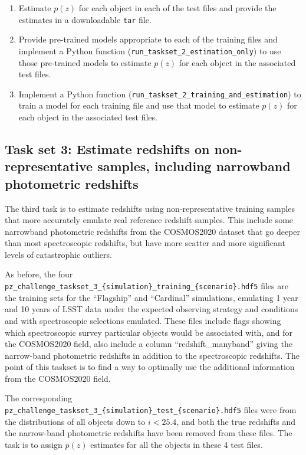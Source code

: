 \documentclass[11pt,twoside,letterpaper,onecolumn,english]{article}
\begin{document}
\begin{enumerate}
  \item{Estimate $p(z)$ for each object in each of the test files and
      provide the estimates in a downloadable \texttt{tar} file.}
  \item{Provide pre-trained models appropriate to each of the training
      files and implement a Python function
      (\texttt{run\_taskset\_2\_estimation\_only}) to use those
      pre-trained models to estimate $p(z)$ for each object in the
      associated test files.}    
  \item{Implement a Python function
      (\texttt{run\_taskset\_2\_training\_and\_estimation}) to train a model for
      each training file and use that model to estimate $p(z)$ for
      each object in the associated test files.}    
\end{enumerate}
  

\subsection{Task set 3: Estimate redshifts on non-representative samples, including narrowband photometric redshifts}

The third task is to estimate redshifts using non-representative
training samples that more accurately emulate real reference redshift
samples. This include some narrowband photometric redshifts from the
COSMOS2020 dataset that go deeper than most spectroscopic redshifts, but
have more scatter and more significant levels of catastrophic outliers.

As before, the four
\texttt{pz\_challenge\_taskset\_3\_\{simulation\}\_training\_\{scenario\}.hdf5}
files are the training sets for the ``Flagship'' and ``Cardinal''
simulations, emulating 1 year and 10 years of LSST data under the expected observing
strategy and conditions and with spectroscopic selections emulated.
These files include flags showing which spectroscopic survey particular
objects would be associated with, and for the COSMOS2020 field, also
include a column “redshift\_manyband” giving the narrow-band photometric
redshifts in addition to the spectroscopic redshifts. The point of this
taskset is to find a way to optimally use the additional information
from the COSMOS2020 field.

The corresponding 
\texttt{pz\_challenge\_taskset\_3\_\{simulation\}\_test\_\{scenario\}.hdf5}
files were \allowbreak from the distributions of all objects down to $i< 25.4$,
and both the true redshifts and the narrow-band photometric redshifts
have been removed from these files. The task is to assign $p(z)$
estimates for all the objects in these 4 test files.
\end{document}

